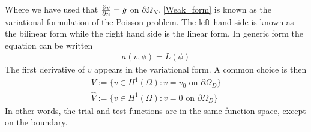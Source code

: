 Where we have used that $\frac{\partial v}{\partial n} = g$ on $\partial \Omega_N$. \eqref{Weak_form} is known as the variational formulation of the Poisson problem.  The left hand side is known as the bilinear form while the right hand side is the linear form. In generic form the equation can be written
\begin{align}
a(v,\phi) = L(\phi) \label{Bilinear}
\end{align}
The first derivative of $v$ appears in the variational form. A common choice is then
\begin{align}
 V := \{ v \in H^1(\Omega) : v = v_0 \text{ on } \partial \Omega_D \} \\
 \hat{V} := \{ v \in H^1(\Omega) : v = 0 \text{ on } \partial \Omega_D \}
\end{align}
In other words, the trial and test functions are in the same function space, except on the boundary.



